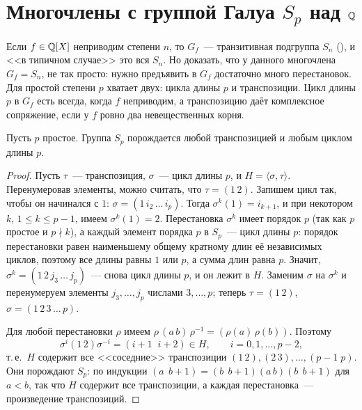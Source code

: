 \makeatletter
{}
\makeatother
\section{Многочлены с группой Галуа \texorpdfstring{$S_p$}{S\_p} над \texorpdfstring{$\mathbb Q$}{Q}}

Если $f\in\mathbb Q[X]$ неприводим степени $n$, то $G_f$~--- транзитивная подгруппа $S_n$ (), и <<в типичном случае>> это
вся $S_n$. Но доказать, что у данного многочлена $G_f=S_n$, не так просто: нужно предъявить в $G_f$ достаточно много
перестановок. Для простой степени $p$ хватает двух: цикла длины $p$ и транспозиции. Цикл длины $p$ в $G_f$ есть всегда,
когда $f$ неприводим, а транспозицию даёт комплексное сопряжение, если у $f$ ровно два невещественных корня.

\begin{lemma}[4.15]
Пусть $p$ простое. Группа $S_p$ порождается любой транспозицией и любым циклом длины $p$.
\end{lemma}

\begin{proof}
Пусть $\tau$~--- транспозиция, $\sigma$~--- цикл длины $p$, и $H=\langle\sigma,\tau\rangle$. Перенумеровав элементы, можно
считать, что $\tau=(1\,2)$. Запишем цикл так, чтобы он начинался с $1$: $\sigma=(1\,i_2\,\dots\,i_p)$. Тогда
$\sigma^k(1)=i_{k+1}$, и при некотором $k$, $1\le k\le p-1$, имеем $\sigma^k(1)=2$. Перестановка $\sigma^k$ имеет порядок $p$
(так как $p$ простое и $p\nmid k$), а каждый элемент порядка $p$ в $S_p$~--- цикл длины $p$: порядок перестановки равен
наименьшему общему кратному длин её независимых циклов, поэтому все длины равны $1$ или $p$, а сумма длин равна $p$.
Значит, $\sigma^k=(1\,2\,j_3\,\dots\,j_p)$~--- снова цикл длины $p$, и он лежит в $H$. Заменим $\sigma$ на $\sigma^k$ и
перенумеруем элементы $j_3,\dots,j_p$ числами $3,\dots,p$; теперь $\tau=(1\,2)$, $\sigma=(1\,2\,3\,\dots\,p)$.

Для любой перестановки $\rho$ имеем $\rho\,(a\,b)\,\rho^{-1}=(\rho(a)\,\rho(b))$. Поэтому
\[
\sigma^i(1\,2)\sigma^{-i}=(i+1\;\;i+2)\in H,\qquad i=0,1,\dots,p-2,
\]
т.\,е.\ $H$ содержит все <<соседние>> транспозиции $(1\,2),(2\,3),\dots,(p-1\;p)$. Они порождают $S_p$: по индукции
$(a\;\,b+1)=(b\;\,b+1)(a\,b)(b\;\,b+1)$ для $a<b$, так что $H$ содержит все транспозиции, а каждая перестановка~---
произведение транспозиций.
\end{proof}

